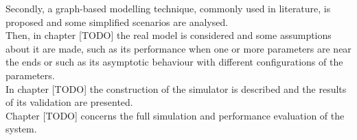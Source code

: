 Secondly, a graph-based modelling technique, commonly used in literature, is proposed and some simplified scenarios are analysed.\\
Then, in chapter [TODO] the real model is considered and some assumptions about it are made, such as its performance when one or more parameters are near the ends or such as its asymptotic behaviour with different configurations of the parameters.\\
In chapter [TODO] the construction of the simulator is described and the results of its validation are presented.\\
Chapter [TODO] concerns the full simulation and performance evaluation of the system.
